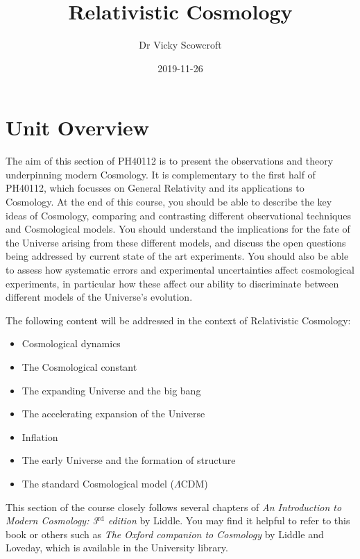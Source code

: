 \documentclass[]{book}
\title{Relativistic Cosmology}
\author{Dr Vicky Scowcroft}
\date{2019-11-26}
\begin{document}
\maketitle

{
\setcounter{tocdepth}{1}
\tableofcontents
}
\hypertarget{unit-overview}{%
\chapter{Unit Overview}\label{unit-overview}}

The aim of this section of PH40112 is to present the observations and
theory underpinning modern Cosmology. It is complementary to the first
half of PH40112, which focusses on General Relativity and its
applications to Cosmology. At the end of this course, you should be
able to describe the key ideas of Cosmology, comparing and contrasting
different observational techniques and Cosmological models. You should
understand the implications for the fate of the Universe arising from
these different models, and discuss the open questions being addressed
by current state of the art experiments. You should also be able to
assess how systematic errors and experimental uncertainties affect
cosmological experiments, in particular how these affect our ability
to discriminate between different models of the Universe's evolution.

The following content will be addressed in the context of Relativistic
Cosmology:

\begin{itemize}
\item
  Cosmological dynamics
\item
  The Cosmological constant
\item
  The expanding Universe and the big bang
\item
  The accelerating expansion of the Universe
\item
  Inflation
\item
  The early Universe and the formation of structure
\item
  The standard Cosmological model (\(\Lambda\)CDM)
\end{itemize}

This section of the course closely follows several chapters of \emph{An
Introduction to Modern Cosmology: 3\(^{\text{rd}}\) edition} by Liddle.
You may find it helpful to refer to this book or others such as \emph{The
Oxford companion to Cosmology} by Liddle and Loveday, which is
available in the University library.
\end{document}
